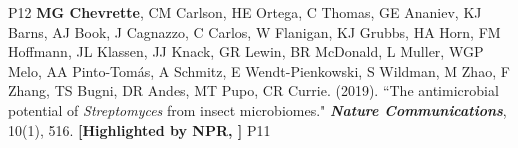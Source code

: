 \begin{cvpubs}
{    } %
    {P12} %
  \cvpub
    {\textbf{MG Chevrette}, CM Carlson, HE Ortega, C Thomas, GE Ananiev, KJ Barns, AJ Book, J Cagnazzo, C Carlos, W Flanigan, KJ Grubbs, HA Horn, FM Hoffmann, JL Klassen, JJ Knack, GR Lewin, BR McDonald, L Muller, WGP Melo, AA Pinto-Tom\'{a}s, A Schmitz, E Wendt-Pienkowski, S Wildman, M Zhao, F Zhang, TS Bugni, DR Andes, MT Pupo, CR Currie. (2019). ``The antimicrobial potential of \textit{Streptomyces} from insect microbiomes." \textit{\textbf{Nature Communications}}, 10(1), 516. \textbf{\textit{}}
    \linebreak \textbf{[Highlighted by NPR, \textit{}]}
    } %
    {P11} %
\end{cvpubs}
